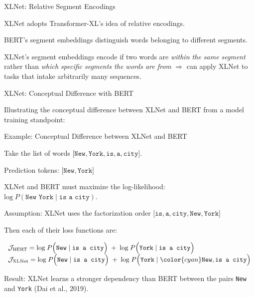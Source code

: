 \begin{frame}{XLNet: Relative Segment Encodings}
    \normalsize
    \begin{itemizeSpaced}{10pt}
        \item XLNet adopts Transformer-XL's idea of relative encodings. 
        
        \item BERT's segment embeddings distinguish words belonging to different segments. 
        
        \pinkbox XLNet's segment embeddings encode if two words are \emph{within the same segment} rather than \emph{which specific segments the words are from} $\Rightarrow$ can apply XLNet to tasks that intake arbitrarily many sequences. 
    \end{itemizeSpaced}
    
\end{frame}


\begin{frame}{XLNet: Conceptual Difference with BERT}

Illustrating the conceptual difference between XLNet and BERT from a model training standpoint: 

    \begin{exampleBlock}{Example: Conceptual Difference between XLNet and BERT}
    

    Take the list of words $\Big[ \texttt{New}, \texttt{York}, \texttt{is}, \texttt{a}, \texttt{city} \Big]$. 
    
    Prediction tokens: $\Big[ \texttt{New}, \texttt{York} \Big]$ 
    
    XLNet and BERT must maximize the log-likelihood: $\text{log} \; P(\texttt{New York} \; | \; \texttt{is a city})$. 
    
    Assumption: XLNet uses the factorization order $\Big[ \texttt{is}, \texttt{a}, \texttt{city}, \texttt{New}, \texttt{York} \Big]$
    
    Then each of their loss functions are: 
    
    \begin{equation}
    \begin{array}{ll}
    \mathcal{J}_\text{BERT} = \text{log} \; P \Big( \texttt{New} \; | \; \texttt{is a city} \Big) \; + \; \text{log} \; P \Big( \texttt{York} \; | \; \texttt{is a city} \Big) \\
    \mathcal{J}_\text{XLNet} = \text{log} \; P \Big( \texttt{New} \; | \; \texttt{is a city} \Big) \; + \; \text{log} \; P \Big( \texttt{York} \; | \; {\color{cyan} \texttt{New}}, \texttt{is a city} \Big) 
    \end{array}
    \end{equation}
    
    Result: XLNet learns a stronger dependency than BERT between the pairs \texttt{New} and \texttt{York} (Dai et al., 2019). 
    
    \end{exampleBlock}
    
\end{frame}